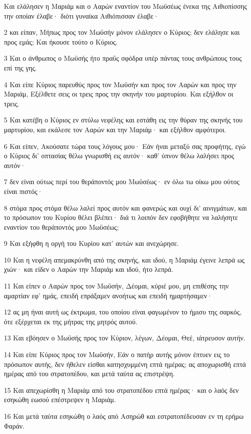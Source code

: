 \par Και ελάλησεν η Μαριάμ και ο Ααρών εναντίον του Μωϋσέως ένεκα της Αιθιοπίσσης την οποίαν έλαβε· διότι γυναίκα Αιθιόπισσαν έλαβε·
\par 2 και είπαν, Μήπως προς τον Μωϋσήν μόνον ελάλησεν ο Κύριος; δεν ελάλησε και προς εμάς; Και ήκουσε τούτο ο Κύριος.
\par 3 Και ο άνθρωπος ο Μωϋσής ήτο πραΰς σφόδρα υπέρ πάντας τους ανθρώπους τους επί της γης.
\par 4 Και είπε Κύριος παρευθύς προς τον Μωϋσήν και προς τον Ααρών και προς την Μαριάμ, Εξέλθετε σεις οι τρεις προς την σκηνήν του μαρτυρίου. Και εξήλθον οι τρεις.
\par 5 Και κατέβη ο Κύριος εν στύλω νεφέλης και εστάθη εις την θύραν της σκηνής του μαρτυρίου, και εκάλεσε τον Ααρών και την Μαριάμ· και εξήλθον αμφότεροι.
\par 6 Και είπεν, Ακούσατε τώρα τους λόγους μου· Εάν ήναι μεταξύ σας προφήτης, εγώ ο Κύριος δι' οπτασίας θέλω γνωρισθή εις αυτόν· καθ' ύπνον θέλω λαλήσει προς αυτόν·
\par 7 δεν είναι ούτως περί του θεράποντός μου Μωϋσέως· εν όλω τω οίκω μου ούτος είναι πιστός·
\par 8 στόμα προς στόμα θέλω λαλεί προς αυτόν και φανερώς και ουχί δι' αινιγμάτων, και το πρόσωπον του Κυρίου θέλει βλέπει· διά τι λοιπόν δεν εφοβήθητε να λαλήσητε εναντίον του θεράποντός μου Μωϋσέως;
\par 9 Και εξήφθη η οργή του Κυρίου κατ' αυτών και ανεχώρησε.
\par 10 Και η νεφέλη απεμακρύνθη από της σκηνής, και ιδού, η Μαριάμ έγεινε λεπρά ως χιών· και είδεν ο Ααρών την Μαριάμ και ιδού, ήτο λεπρά.
\par 11 Και είπεν ο Ααρών προς τον Μωϋσήν, Δέομαι, κύριέ μου, μη επιθέσης την αμαρτίαν εφ' ημάς, επειδή επράξαμεν ανοήτως και επειδή ημαρτήσαμεν·
\par 12 ας μη ήναι αυτή ως έκτρωμα, του οποίου είναι φαγωμένον το ήμισυ της σαρκός, ότε εξέρχεται εκ της μήτρας της μητρός αυτού.
\par 13 Και εβόησεν ο Μωϋσής προς τον Κύριον, λέγων, Δέομαι, Θεέ, ιάτρευσον αυτήν.
\par 14 Και είπε Κύριος προς τον Μωϋσήν, Εάν ο πατήρ αυτής μόνον έπτυεν εις το πρόσωπον αυτής, δεν ήθελεν είσθαι κατησχυμμένη επτά ημέρας; ας αποχωρισθή επτά ημέρας από του στρατοπέδου, και μετά ταύτα ας επιστρέψη.
\par 15 Και απεχωρίσθη η Μαριάμ από του στρατοπέδου επτά ημέρας· και ο λαός δεν εσηκώθη εωσού επέστρεψεν η Μαριάμ.
\par 16 Και μετά ταύτα εσηκώθη ο λαός από Ασηρώθ και εστρατοπέδευσαν εν τη ερήμω Φαράν.

